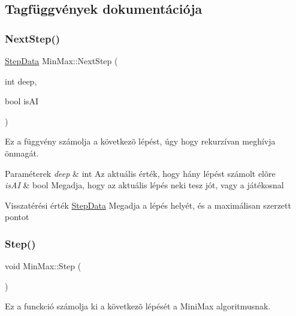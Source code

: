 \subsection{Tagfüggvények dokumentációja}
\mbox{\label{class_min_max_ab491c411792412ad53665cbce23c0286}} 
\subsubsection{\texorpdfstring{Next\+Step()}{NextStep()}}
{\footnotesize\ttfamily \hyperlink{struct_step_data}{Step\+Data} Min\+Max\+::\+Next\+Step (\begin{DoxyParamCaption}\item[{int}]{deep,  }\item[{bool}]{is\+AI }\end{DoxyParamCaption})\hspace{0.3cm}{\ttfamily [private]}}



Ez a függvény számolja a következõ lépést, úgy hogy rekurzívan meghívja önmagát. 


\begin{DoxyParams}{Paraméterek}
{\em deep} & int Az aktuális érték, hogy hány lépést számolt elõre \\
\hline
{\em is\+AI} & bool Megadja, hogy az aktuális lépés neki tesz jót, vagy a játékosnal \\
\hline
\end{DoxyParams}
\begin{DoxyReturn}{Visszatérési érték}
\hyperlink{struct_step_data}{Step\+Data} Megadja a lépés helyét, és a maximálisan szerzett pontot 
\end{DoxyReturn}
\mbox{\label{class_min_max_a8448a9ea304b2890ddca4a123de5693b}} 
\subsubsection{\texorpdfstring{Step()}{Step()}}
{\footnotesize\ttfamily void Min\+Max\+::\+Step (\begin{DoxyParamCaption}{ }\end{DoxyParamCaption})}



Ez a funckció számolja ki a következõ lépését a Mini\+Max algoritmusnak. 

